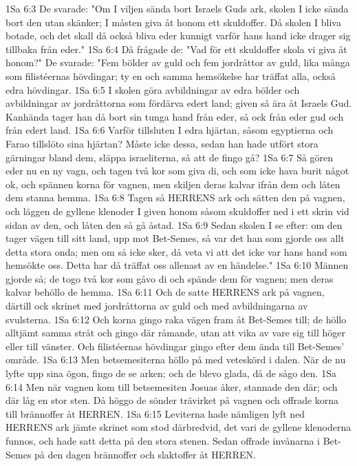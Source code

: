 1Sa 6:3  De svarade: "Om I viljen sända bort Israels Guds ark, skolen I icke sända bort den utan skänker; I måsten giva åt honom ett skuldoffer. Då skolen I bliva botade, och det skall då också bliva eder kunnigt varför hans hand icke drager sig tillbaka från eder."
1Sa 6:4  Då frågade de: "Vad för ett skuldoffer skola vi giva åt honom?" De svarade: "Fem bölder av guld och fem jordråttor av guld, lika många som filistéernas hövdingar; ty en och samma hemsökelse har träffat alla, också edra hövdingar.
1Sa 6:5  I skolen göra avbildningar av edra bölder och avbildningar av jordråttorna som fördärva edert land; given så ära åt Israels Gud. Kanhända tager han då bort sin tunga hand från eder, så ock från eder gud och från edert land.
1Sa 6:6  Varför tillsluten I edra hjärtan, såsom egyptierna och Farao tillslöto sina hjärtan? Måste icke dessa, sedan han hade utfört stora gärningar bland dem, släppa israeliterna, så att de fingo gå?
1Sa 6:7  Så gören eder nu en ny vagn, och tagen två kor som giva di, och som icke hava burit något ok, och spännen korna för vagnen, men skiljen deras kalvar ifrån dem och låten dem stanna hemma.
1Sa 6:8  Tagen så HERRENS ark och sätten den på vagnen, och läggen de gyllene klenoder I given honom såsom skuldoffer ned i ett skrin vid sidan av den, och låten den så gå åstad.
1Sa 6:9  Sedan skolen I se efter: om den tager vägen till sitt land, upp mot Bet-Semes, så var det han som gjorde oss allt detta stora onda; men om så icke sker, då veta vi att det icke var hans hand som hemsökte oss. Detta har då träffat oss allenast av en händelse."
1Sa 6:10  Männen gjorde så; de togo två kor som gåvo di och spände dem för vagnen; men deras kalvar behöllo de hemma.
1Sa 6:11  Och de satte HERRENS ark på vagnen, därtill ock skrinet med jordråttorna av guld och med avbildningarna av svulsterna.
1Sa 6:12  Och korna gingo raka vägen fram åt Bet-Semes till; de höllo alltjämt samma stråt och gingo där råmande, utan att vika av vare sig till höger eller till vänster. Och filistéernas hövdingar gingo efter dem ända till Bet-Semes' område.
1Sa 6:13  Men betsemesiterna höllo på med veteskörd i dalen. När de nu lyfte upp sina ögon, fingo de se arken; och de blevo glada, då de sågo den.
1Sa 6:14  Men när vagnen kom till betsemesiten Josuas åker, stannade den där; och där låg en stor sten. Då höggo de sönder trävirket på vagnen och offrade korna till brännoffer åt HERREN.
1Sa 6:15  Leviterna hade nämligen lyft ned HERRENS ark jämte skrinet som stod därbredvid, det vari de gyllene klenoderna funnos, och hade satt detta på den stora stenen. Sedan offrade invånarna i Bet-Semes på den dagen brännoffer och slaktoffer åt HERREN.
